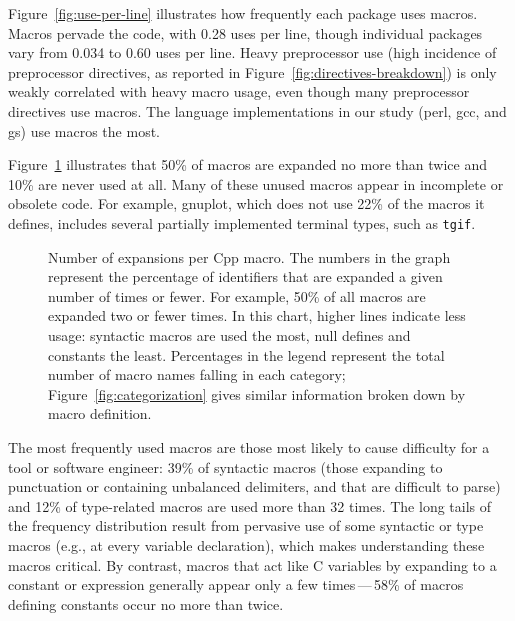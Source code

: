 \documentclass[10pt]{article}
\newcommand{\pkg}[1]{\textsf{#1}}
\newcommand{\captionsmall}[1]{\caption[]{\small #1}}
\begin{document}

Figure~\ref{fig:use-per-line} illustrates how frequently each package uses
macros.  Macros pervade the code, with 0.28 uses per line, though
individual packages vary from 0.034 to 0.60 uses per line.  Heavy preprocessor
use (high incidence of preprocessor directives, as reported in
Figure~\ref{fig:directives-breakdown}) is only weakly correlated with
heavy macro usage, even though many preprocessor directives use macros.
The language implementations in our study (\pkg{perl}, \pkg{gcc}, and
\pkg{gs}) use macros the most.


Figure~\ref{fig:freq-use-cat} illustrates that 50\% of macros are expanded
no more than twice and 10\% are never used at all.  Many of these unused
macros appear in incomplete or obsolete code.  For example, \pkg{gnuplot},
which does not use 22\% of the macros it defines, includes several
partially implemented terminal types, such as {\tt tgif}.

\begin{figure}
\centerline{}
\captionsmall{Number of expansions per Cpp macro.  The numbers in the
  graph represent the percentage of identifiers that are expanded a given
  number of times or fewer.  For example, 50\% of all macros are expanded
  two or fewer times.  In this chart, higher lines indicate less usage:
  syntactic macros are used the most, null defines and constants the least.
  Percentages in the legend represent the total number of
  macro names falling in each category; Figure~\ref{fig:categorization}
  gives similar information broken down by macro definition.}
\label{fig:freq-use-cat}
\end{figure}




The most frequently used macros are those most likely to cause difficulty
for a tool or software engineer:  39\% of syntactic macros (those expanding
to punctuation or containing unbalanced delimiters, and that are
difficult to parse) and 12\% of type-related macros are used more than 32
times.  The long tails of the frequency distribution result from pervasive
use of some syntactic or type macros (e.g., at every variable declaration),
which makes understanding these macros critical.  By contrast, macros that
act like C variables by expanding to a constant or expression generally
appear only a few times\,---\,58\% of macros defining constants occur no
more than twice.
\end{document}
